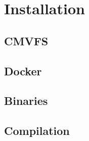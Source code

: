 \chapter{Installation}
\label{ch:installation}

\section{CMVFS}

\cite{cvmfs}

\section{Docker}

\section{Binaries}

\section{Compilation}
